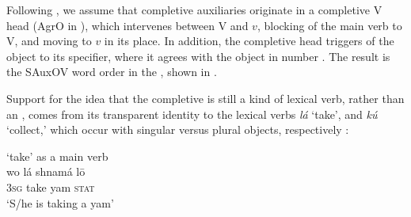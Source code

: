 \documentclass[output=paper,newtxmath,modfonts,nonflat,draftmode]{langsci/langscibook}
\begin{document}
%

Following \citet{kandy03}, we assume that completive auxiliaries originate in a completive V head (AgrO in \citet{kandy03}), which intervenes between V and $v$, blocking  of the main verb to V, and moving to $v$ in its place. In addition, the completive head triggers  of the object to its specifier, where it agrees with the object in number . The result is the SAuxOV word order in the , shown in .

Support for the idea that the completive is still a kind of lexical verb, rather than an , comes from its transparent identity to the lexical verbs \textit{lá} `take', and \textit{kú} `collect,' which occur with singular versus plural objects, respectively \citep[63]{hyman1970}:

\ea \label{ex:Gwari-takecollect}

\ea \label{ex:Gwari-take} { `take' as a main verb}	\\
\gll wo lá shnamá l\=o \\
3\textsc{sg} take yam \textsc{stat} \\
\glt `S/he is taking a yam' \hfill \citep[][92]{hyman1970}
\end{document}
